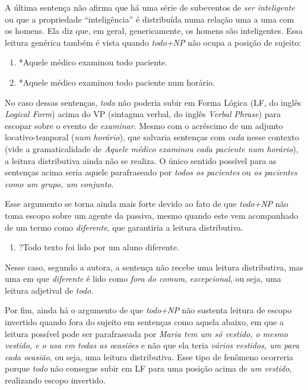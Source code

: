 A última sentença não afirma que há uma série de subeventos de \emph{ser inteligente} ou que a propriedade ``inteligência'' é distribuída numa relação uma a uma com os homens. Ela diz que, em geral, genericamente, os homens são inteligentes. Essa leitura genérica também é vista quando \emph{todo+NP} não ocupa a posição de sujeito:

\begin{enumerate}[resume]
    \item *Aquele médico examinou todo paciente.
    \item *Aquele médico examinou todo paciente num horário.
 \end{enumerate}

No caso dessas sentenças, \emph{todo} não poderia subir em Forma Lógica (LF, do inglês \emph{Logical Form}) acima do VP (sintagma verbal, do inglês \emph{Verbal Phrase}) para escopar sobre o evento de \emph{examinar}. Mesmo com o acréscimo de um adjunto locativo-temporal (\emph{num horário}), que salvaria sentenças com \emph{cada} nesse contexto (vide a gramaticalidade de \emph{Aquele médico examinou cada paciente num horário}), a leitura distributiva ainda não se realiza. O único sentido possível para as sentenças acima seria aquele parafraseado por \emph{todos os pacientes} ou \emph{os pacientes como um grupo, um conjunto}.

Esse argumento se torna ainda mais forte devido ao fato de que \emph{todo+NP} não toma escopo sobre um agente da passiva, mesmo quando este vem acompanhado de um termo como \emph{diferente}, que garantiria a leitura distributiva.

 \begin{enumerate}[resume]
     \item ?Todo texto foi lido por um aluno diferente.
 \end{enumerate}

Nesse caso, segundo a autora, a sentença não recebe uma leitura distributiva, mas uma em que \emph{diferente} é lido como \emph{fora do comum}, \emph{excepcional}, ou seja, uma leitura adjetival de \emph{todo}.

Por fim, ainda há o argumento de que \emph{todo+NP} não sustenta leitura de escopo invertido quando fora do sujeito em sentenças como aquela abaixo, em que a leitura possível pode ser parafraseada por \emph{Maria tem um só vestido, o mesmo vestido, e o usa em todas as ocasiões} e não que ela teria \emph{vários vestidos, um para cada ocasião}, ou seja, uma leitura distributiva. Esse tipo de fenômeno ocorreria porque \emph{todo} não consegue subir em LF para uma posição acima de \emph{um vestido}, realizando escopo invertido.

